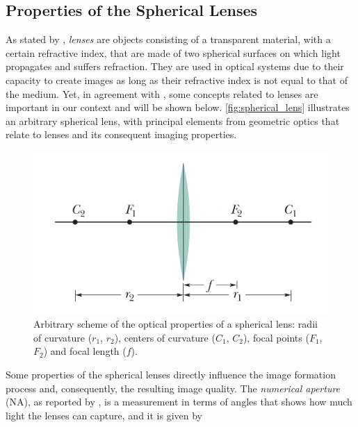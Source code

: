 \subsection{Properties of the Spherical Lenses}

As stated by , \emph{lenses} are objects consisting of a transparent material, with a certain refractive index, that are made of two spherical surfaces on which light propagates and suffers refraction. They are used in optical systems due to their capacity to create images as long as their refractive index is not equal to that of the medium. Yet, in agreement with , some concepts related to lenses are important in our context and will be shown below. \autoref{fig:spherical_lens} illustrates an arbitrary spherical lens, with principal elements from geometric optics that relate to lenses and its consequent imaging properties.

\begin{figure}[htb]
	\centering
	\caption{\label{fig:spherical_lens} Arbitrary scheme of the optical properties of a spherical lens: radii of curvature ($r_{1}$, $r_{2}$), centers of curvature ($C_{1}$, $C_{2}$), focal points ($F_{1}$, $F_{2}$) and focal length ($f$).}
	\begin{center}
	    \includegraphics[scale=0.4]{images/fig4.png}
	\end{center}
	\centering
\end{figure}

Some properties of the spherical lenses directly influence the image formation process and, consequently, the resulting image quality. The \emph{numerical aperture} (NA), as reported by , is a measurement in terms of angles that shows how much light the lenses can capture, and it is given by

